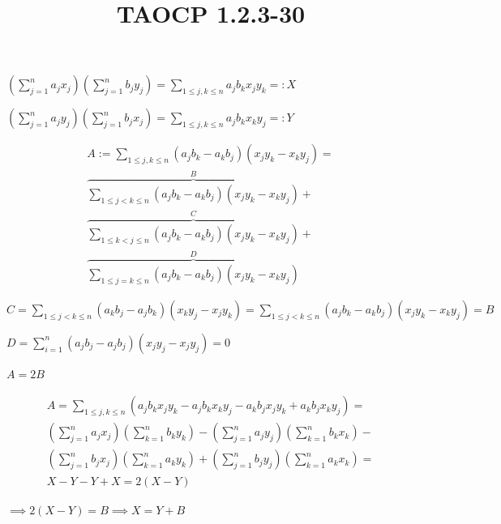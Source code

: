 \documentclass{article}
\title{TAOCP 1.2.3\mbox{-}30}
\begin{document}
\maketitle

\( (\sum_{j=1}^{n} a_{j}x_{j})(\sum_{j=1}^{n} b_{j}y_{j}) = \sum_{1 \leq j,k \leq n} a_{j}b_{k}x_{j}y_{k} =: X \)

\( (\sum_{j=1}^{n} a_{j}y_{j})(\sum_{j=1}^{n} b_{j}x_{j}) = \sum_{1 \leq j,k \leq n} a_{j}b_{k}x_{k}y_{j} =: Y \)

\begin{multline*}
A := \sum_{1 \leq j, k \leq n } (a_{j}b_{k} - a_{k}b_{j})(x_{j}y_{k} - x_{k}y_{j}) = \\
\overbrace{\sum_{1 \leq j < k \leq n } (a_{j}b_{k} - a_{k}b_{j})(x_{j}y_{k} - x_{k}y_{j})}^{B} + \\
\overbrace{\sum_{1 \leq k < j \leq n } (a_{j}b_{k} - a_{k}b_{j})(x_{j}y_{k} - x_{k}y_{j})}^{C} + \\
\overbrace{\sum_{1 \leq j = k \leq n } (a_{j}b_{k} - a_{k}b_{j})(x_{j}y_{k} - x_{k}y_{j})}^{D}
\end{multline*}

\( C = \sum_{1 \leq j < k \leq n } (a_{k}b_{j} - a_{j}b_{k})(x_{k}y_{j} - x_{j}y_{k}) = \sum_{1 \leq j < k \leq n } (a_{j}b_{k} - a_{k}b_{j})(x_{j}y_{k} - x_{k}y_{j}) = B \)

\( D = \sum_{i=1}^{n}(a_{j}b_{j}-a_{j}b_{j})(x_{j}y_{j}-x_{j}y_{j}) = 0 \)

\( A = 2B \)

\begin{multline*}
A = \sum_{1\leq j,k \leq n} (a_{j}b_{k}x_{j}y_{k} - a_{j}b_{k}x_{k}y_{j} - a_{k}b_{j}x_{j}y_{k} + a_{k}b_{j}x_{k}y_{j}) = \\
(\sum_{j=1}^{n} a_{j}x_{j})(\sum_{k=1}^{n} b_{k}y_{k}) - (\sum_{j=1}^{n} a_{j}y_{j})(\sum_{k=1}^{n} b_{k}x_{k}) - \\
(\sum_{j=1}^{n} b_{j}x_{j})(\sum_{k=1}^{n} a_{k}y_{k}) + (\sum_{j=1}^{n} b_{j}y_{j})(\sum_{k=1}^{n} a_{k}x_{k}) = \\
X - Y - Y + X = 2(X-Y)
\end{multline*}

\( \implies 2(X-Y) = B \implies X = Y + B \)
\end{document}
